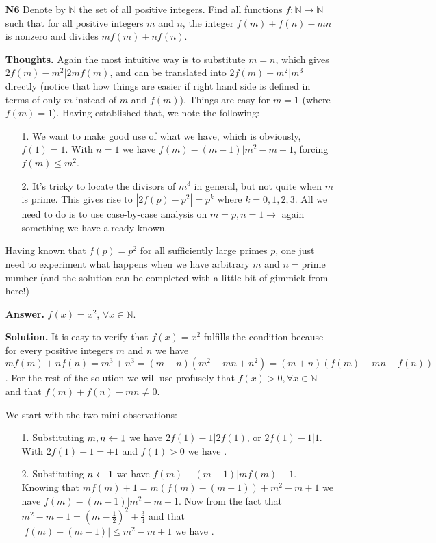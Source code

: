 \documentclass[11pt,a4paper]{article}
\begin{document}
\begin{itemize}
\newpage

\item[\textbf{N6}]
Denote by $\mathbb{N}$ the set of all positive integers. Find all functions $f:\mathbb{N}\rightarrow \mathbb{N}$ such that for all positive integers $m$ and $n$, the integer $f(m)+f(n)-mn$ is nonzero and divides $mf(m)+nf(n)$.

\textbf{Thoughts.} Again the most intuitive way is to substitute $m=n$, which gives $2f(m)-m^2|2mf(m)$, and can be translated into $2f(m)-m^2|m^3$ directly (notice that how things are easier if right hand side is defined in terms of only $m$ instead of $m$ and $f(m)$). Things are easy for $m=1$ (where $f(m)=1$). Having established that, we note the following: 
\begin{itemize}
\item [1.] We want to make good use of what we have, which is obviously, $f(1)=1$. With $n=1$ we have $f(m)-(m-1)|m^2-m+1$, forcing $f(m)\le m^2$. 
\item [2.] It's tricky to locate the divisors of $m^3$ in general, but not quite when $m$ is prime. This gives rise to $|2f(p)-p^2|=p^k$ where $k=0, 1, 2, 3$. All we need to do is to use case-by-case analysis on $m=p, n=1\to$ again something we have already known. 
\end{itemize}
Having known that $f(p)=p^2$ for all sufficiently large primes $p$, one just need to experiment what happens when we have arbitrary $m$ and $n=$prime number (and the solution can be completed with a little bit of gimmick from here!)

\textbf{Answer.} $f(x)=x^2$, $\forall x\in\mathbb{N}$. 

\textbf{Solution.}
It is easy to verify that $f(x)=x^2$ fulfills the condition because for every positive integers $m$ and $n$ we have 
$mf(m)+nf(n)=m^3+n^3=(m+n)(m^2-mn+n^2)=(m+n)(f(m)-mn+f(n))$. For the rest of the solution we will use profusely that $f(x)>0, \forall x\in\mathbb{N}$ and that $f(m)+f(n)-mn\neq 0$. 

We start with the two mini-observations: 
\begin{itemize}
\item [1.] Substituting $m, n\leftarrow 1$ we have $2f(1)-1|2f(1)$, or $2f(1)-1|1$. With $2f(1)-1=\pm 1$ and $f(1)>0$ we have . 
\item [2.] Substituting $n\leftarrow 1$ we have $f(m)-(m-1)|mf(m)+1$. Knowing that $mf(m)+1=m(f(m)-(m-1))+m^2-m+1$ we have 
$f(m)-(m-1)|m^2-m+1$. Now from the fact that $m^2-m+1=\left(m-\frac 12\right)^2+\frac 34$ and that $|f(m)-(m-1)|\le m^2-m+1$ we have . 
\end{itemize}


\end{itemize}
\end{document}
